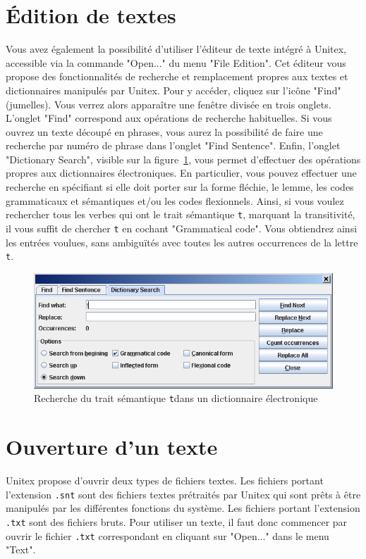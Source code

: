 \section{Édition de textes}
Vous avez également la possibilité d’utiliser l’éditeur de texte intégré à Unitex, accessible
via la commande "Open..." du menu "File Edition". Cet éditeur vous propose des fonctionnalités
de recherche et remplacement propres aux textes et dictionnaires manipulés par Unitex. Pour y
accéder, cliquez sur l’icône "Find" (jumelles). Vous verrez alors apparaître une fenêtre divisée en
trois onglets. L’onglet "Find" correspond aux opérations de recherche habituelles. Si vous ouvrez un
texte découpé en phrases, vous aurez la possibilité de faire une recherche par numéro de phrase dans
l’onglet "Find Sentence". Enfin, l’onglet "Dictionary Search", visible sur la
figure~\ref{dictionary-search}, vous permet d’effectuer des opérations propres aux dictionnaires
électroniques. En particulier, vous pouvez effectuer une recherche en spécifiant si elle doit porter
sur la forme fléchie, le lemme, les codes grammaticaux et sémantiques et/ou les codes flexionnels.
Ainsi, si vous voulez rechercher tous les verbes qui ont le trait sémantique
\verb$t$, marquant la transitivité, il vous suffit de chercher \verb$t$ en cochant
"Grammatical code". Vous obtiendrez ainsi les entrées voulues, sans ambiguïtés avec toutes les
autres occurrences de la lettre \verb$t$.


\begin{figure}[!ht]
\begin{center}
\includegraphics[width=15cm]{resources/img/fig2-6.png}
\caption{Recherche du trait sémantique \texttt{t}dans un dictionnaire
électronique\label{dictionary-search}}
\end{center}
\end{figure}


\section{Ouverture d’un texte}
\noindent Unitex propose d’ouvrir deux types de fichiers textes. 
Les fichiers portant l’extension \verb+.snt+ sont des fichiers textes prétraités 
par Unitex qui sont prêts à être manipulés par les différentes fonctions du système.
Les fichiers portant l’extension \verb+.txt+ sont des fichiers bruts.
Pour utiliser un texte, il faut donc commencer par ouvrir le fichier  \verb+.txt+
correspondant en cliquant sur "Open..." dans le menu "Text".


